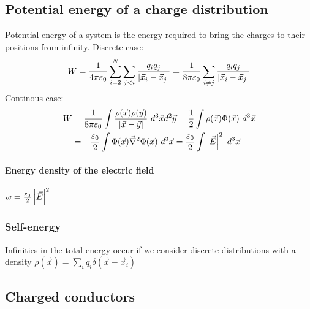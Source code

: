 \subsection{Potential energy of a charge distribution}

Potential energy of a system is the energy required to bring the charges to
their positions from infinity. Discrete case:
\begin{align*}
    W = \frac{1}{4 \pi \varepsilon_0} \sum_{i=2}^{N} \sum_{j<i} \frac{q_i q_j}{\left\vert \vec{x}_i - \vec{x}_j \right\vert}
    = \frac{1}{8 \pi \varepsilon_0} \sum_{i \neq j} \frac{q_i q_j}{\left\vert \vec{x}_i - \vec{x}_j \right\vert}
\end{align*}
Continous case:
\begin{align*}
    W &= \frac{1}{8 \pi \varepsilon_0} \int \frac{\rho(\vec{x}) \rho(\vec{y})}{\left\vert \vec{x} - \vec{y} \right\vert} \ d^3 \vec{x} d^2 \vec{y}
    = \frac{1}{2} \int \rho(\vec{x}) \Phi(\vec{x}) \ d^3 \vec{x}
    \\
    &= - \frac{\varepsilon_0}{2} \int \Phi(\vec{x}) \vec{\nabla}^2 \Phi(\vec{x}) \ d^3 \vec{x}
    = \frac{\varepsilon_0}{2} \int \left\vert \vec{E} \right\vert^2 \ d^3 \vec{x}
\end{align*}

\paragraph{Energy density of the electric field}
$w = \frac{\varepsilon_0}{2} \left\vert \vec{E} \right\vert^2$


\subsubsection{Self-energy}
Infinities in the total energy occur if we consider discrete distributions with
a density $\rho(\vec{x}) = \sum_i q_i \delta(\vec{x} - \vec{x}_i)$

\subsection{Charged conductors}


